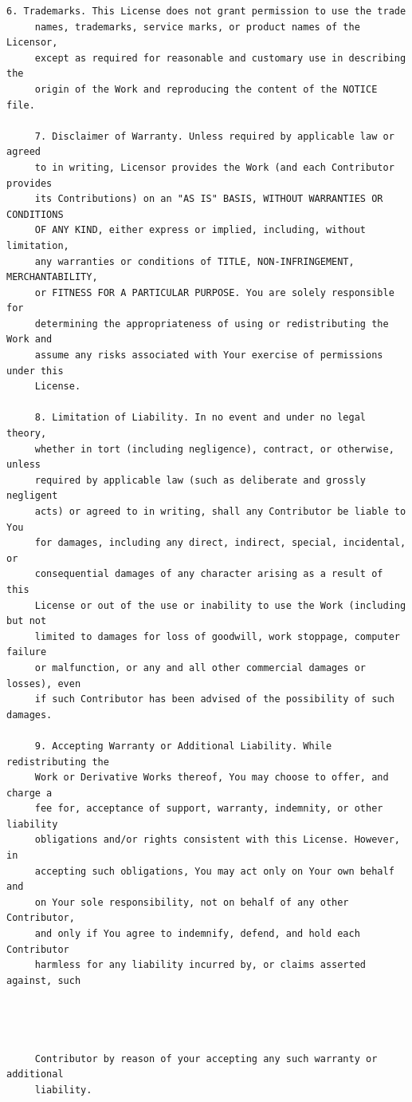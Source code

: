 \begin{lstlisting}[basicstyle=\ttfamily\footnotesize,breaklines=true]
     6. Trademarks. This License does not grant permission to use the trade
     names, trademarks, service marks, or product names of the Licensor,
     except as required for reasonable and customary use in describing the
     origin of the Work and reproducing the content of the NOTICE file.

     7. Disclaimer of Warranty. Unless required by applicable law or agreed
     to in writing, Licensor provides the Work (and each Contributor provides
     its Contributions) on an "AS IS" BASIS, WITHOUT WARRANTIES OR CONDITIONS
     OF ANY KIND, either express or implied, including, without limitation,
     any warranties or conditions of TITLE, NON-INFRINGEMENT, MERCHANTABILITY,
     or FITNESS FOR A PARTICULAR PURPOSE. You are solely responsible for
     determining the appropriateness of using or redistributing the Work and
     assume any risks associated with Your exercise of permissions under this
     License.

     8. Limitation of Liability. In no event and under no legal theory,
     whether in tort (including negligence), contract, or otherwise, unless
     required by applicable law (such as deliberate and grossly negligent
     acts) or agreed to in writing, shall any Contributor be liable to You
     for damages, including any direct, indirect, special, incidental, or
     consequential damages of any character arising as a result of this
     License or out of the use or inability to use the Work (including but not
     limited to damages for loss of goodwill, work stoppage, computer failure
     or malfunction, or any and all other commercial damages or losses), even
     if such Contributor has been advised of the possibility of such damages.

     9. Accepting Warranty or Additional Liability. While redistributing the
     Work or Derivative Works thereof, You may choose to offer, and charge a
     fee for, acceptance of support, warranty, indemnity, or other liability
     obligations and/or rights consistent with this License. However, in
     accepting such obligations, You may act only on Your own behalf and
     on Your sole responsibility, not on behalf of any other Contributor,
     and only if You agree to indemnify, defend, and hold each Contributor
     harmless for any liability incurred by, or claims asserted against, such




     Contributor by reason of your accepting any such warranty or additional
     liability.


\end{lstlisting}
